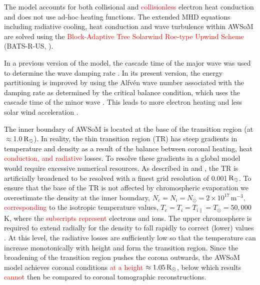 \documentclass[namedreferences]{solarphysics}
\def\edit#1{\textcolor{Red}{#1}}
\newcommand{\mrsun}{{\rm R_\odot}}
\begin{document}
\begin{article}
{The model accounts} for both collisional and \edit{collisionless} electron heat conduction and does not use ad-hoc heating functions. The extended MHD equations including radiative cooling, heat conduction and wave turbulence within AWSoM \citep{Van2014} are solved using the \edit{Block-Adaptive Tree Solarwind Roe-type Upwind Scheme} (BATS-R-US, \citealp{Pow1999, Tot2012}). 

{In a previous} version of the model, the cascade time of the major wave was used to determine the wave damping rate \citep{Cha2011, Van2014}. {In its present version, the {energy partitioning is improved}} by using the Alfv\'{e}n wave number associated with the damping rate as determined by the critical balance condition, which uses the cascade time of the minor wave \citep{Lit2007}. This leads to more electron heating and less solar wind acceleration \citep{Van2019b}.

The inner boundary of AWSoM is located at the base of the transition region (at $\approx$1.0\,$\mrsun$). In reality, the thin {transition region (TR)} has steep gradients in temperature and density as a result of the balance between coronal heating, heat \edit{conduction, and radiative} losses. To resolve these gradients in a global model would require excessive numerical resources. As described in \citet{Lio2009} and \citet{Sok2013}{, the TR is artificially {broadened} to be resolved with a} finest grid resolution of 0.001\,$\mrsun$.  To ensure that the base of the TR is not affected by chromospheric evaporation we overestimate the density at the inner boundary, $N_{e}=N_{i}=N_{\odot} =2\times10^{17}$\,m$^{-3}$\edit{, corresponding} to the isotropic temperature values, $T_{e}=T_{i}=T_{i\parallel}=T_{\odot}=50,000$\,K{, where the \edit{subscripts represent} electrons and ions}. The upper chromosphere is required to extend radially for the density to fall rapidly to correct (lower) values \citep{Lio2009}.  At this level, the radiative losses are sufficiently low so that the temperature can increase monotonically with height and form the transition region. Since the broadening of the transition region pushes the corona outwards, {the AWSoM model achieves coronal conditions \edit{at a height} $\approx 1.05\,\mrsun$, below which results \edit{cannot} then be compared to coronal tomographic reconstructions.}


\end{article}
\end{document}
